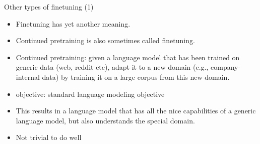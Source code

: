 


\begin{frame}{Other types of finetuning (1)}

\vfill

\begin{itemize}
    \item Finetuning has yet another meaning.
    \item Continued pretraining is also sometimes called
    finetuning.
    \item Continued pretraining: given a language model
that has been    trained on generic data (web, reddit etc),
    adapt it to a new domain (e.g., company-internal data) by
    training it on a large corpus from this new domain.
\item objective: standard language modeling objective
    \item This results in a language model that has all the
    nice capabilities of a generic language model, but also understands the special domain.
\item Not trivial to do well
\end{itemize}

\vfill

\end{frame}



